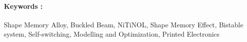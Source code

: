 \vspace{-15pt}
\paragraph{Keywords :}
Shape Memory Alloy, Buckled Beam, NiTiNOL, Shape Memory Effect, Bistable system, Self-switching, Modelling and Optimization, Printed Electronics
